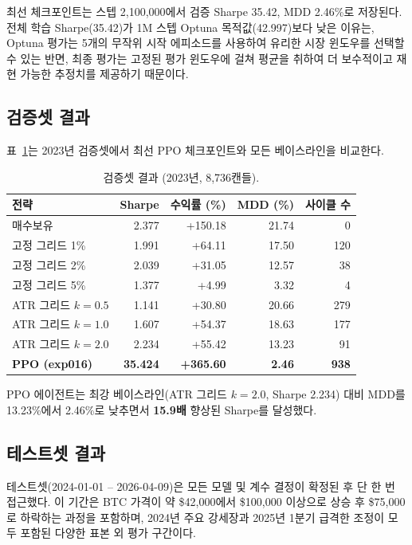 \documentclass[11pt, a4paper]{article}
\begin{document}
최선 체크포인트는 스텝 2,100,000에서 검증 Sharpe 35.42, MDD 2.46\%로 저장된다.
전체 학습 Sharpe(35.42)가 1M 스텝 Optuna 목적값(42.997)보다 낮은 이유는,
Optuna 평가는 5개의 무작위 시작 에피소드를 사용하여 유리한 시장 윈도우를 선택할 수
있는 반면, 최종 평가는 고정된 평가 윈도우에 걸쳐 평균을 취하여 더 보수적이고
재현 가능한 추정치를 제공하기 때문이다.

\subsection{검증셋 결과}

표~\ref{tab:val_results}는 2023년 검증셋에서 최선 PPO 체크포인트와 모든 베이스라인을
비교한다.

\begin{table}[H]
\centering
\caption{검증셋 결과 (2023년, 8,736캔들).}
\label{tab:val_results}
\setlength{\tabcolsep}{6pt}
\begin{tabular}{lrrrr}
\toprule
전략 & Sharpe & 수익률 (\%) & MDD (\%) & 사이클 수 \\
\midrule
매수보유              &  2.377 & +150.18 & 21.74 &    0 \\
고정 그리드 1\%       &  1.991 &  +64.11 & 17.50 &  120 \\
고정 그리드 2\%       &  2.039 &  +31.05 & 12.57 &   38 \\
고정 그리드 5\%       &  1.377 &   +4.99 &  3.32 &    4 \\
ATR 그리드 $k{=}0.5$ &  1.141 &  +30.80 & 20.66 &  279 \\
ATR 그리드 $k{=}1.0$ &  1.607 &  +54.37 & 18.63 &  177 \\
ATR 그리드 $k{=}2.0$ &  2.234 &  +55.42 & 13.23 &   91 \\
\midrule
\textbf{PPO (exp016)} & \textbf{35.424} & \textbf{+365.60} & \textbf{2.46} & \textbf{938} \\
\bottomrule
\end{tabular}
\end{table}

PPO 에이전트는 최강 베이스라인(ATR 그리드 $k{=}2.0$, Sharpe 2.234) 대비
MDD를 13.23\%에서 2.46\%로 낮추면서 \textbf{15.9배} 향상된 Sharpe를 달성했다.

\subsection{테스트셋 결과}
\label{sec:test-results}

테스트셋(2024-01-01 -- 2026-04-09)은 모든 모델 및 계수 결정이 확정된 후
단 한 번 접근했다.
이 기간은 BTC 가격이 약 \$42,000에서 \$100,000 이상으로 상승 후 \$75,000로
하락하는 과정을 포함하며, 2024년 주요 강세장과 2025년 1분기 급격한 조정이
모두 포함된 다양한 표본 외 평가 구간이다.
\end{document}

